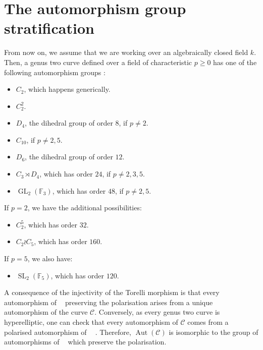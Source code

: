\documentclass{amsart}
\newcommand{\calC}{\mathcal{C}}
\DeclareMathOperator{\Aut}{Aut}
\DeclareMathOperator{\Jac}{Jac}
\DeclareMathOperator{\Jacc}{\Jac(\mathcal{C})}
\newcommand{\GL}{\operatorname{GL}}
\newcommand{\SL}{\operatorname{SL}}
\numberwithin{equation}{section}
\theoremstyle{definition}
\theoremstyle{remark}
\begin{document}
\section{The automorphism group stratification} \label{automorphism_section}
From now on, we assume that we are working over an algebraically closed field $k$. Then, a genus two curve defined over a field of characteristic $p\geq0$ has one of the following automorphism groups \cite{Igusa1960ArithmeticTwo}:
\begin{itemize}
    \item \href{https://beta.lmfdb.org/Groups/Abstract/2.1}{$C_2$}, which happens generically.
    \item \href{https://beta.lmfdb.org/Groups/Abstract/4.2}{$C_2^2$}.
    \item \href{https://beta.lmfdb.org/Groups/Abstract/8.3}{$D_4$}, the dihedral group of order $8$, if $p\neq2$.
    \item \href{https://beta.lmfdb.org/Groups/Abstract/10.2}{$C_{10}$}, if $p\neq 2,5$.
    \item \href{https://beta.lmfdb.org/Groups/Abstract/12.4}{$D_{6}$}, the dihedral group of order $12$.
    \item \href{https://beta.lmfdb.org/Groups/Abstract/24.8}{$C_3\rtimes D_4$}, which has order $24$, if $p\neq 2,3,5$.
    \item \href{https://beta.lmfdb.org/Groups/Abstract/48.29}{$\GL_2(\mathbb{F}_3)$}, which has order $48$, if $p\neq 2,5$.\\
\end{itemize}
If $p=2$, we have the additional possibilities:
\begin{itemize}
    \item \href{https://beta.lmfdb.org/Groups/Abstract/32.51}{$C_2^5$}, which has order $32$.
    \item \href{https://beta.lmfdb.org/Groups/Abstract/160.235}{$C_2\wr C_5$}, which has order $160$.\\
\end{itemize}
If $p=5$, we also have:
\begin{itemize}
    \item \href{https://beta.lmfdb.org/Groups/Abstract/120.5}{$\SL_2(\mathbb{F}_5)$}, which has order $120$.\\
\end{itemize}

A consequence of the injectivity of the Torelli morphism is that every automorphism of $\Jacc$ preserving the polarisation arises from a unique automorphism of the curve $\calC$. Conversely, as every genus two curve is hyperelliptic, one can check that every automorphism of $\calC$ comes from a polarised automorphism of $\Jacc$ \cite[Theorem 12.1]{Milne1986JacobianVarieties}. Therefore, $\Aut(\calC)$ is isomorphic to the group of automorphisms of $\Jacc$ which preserve the polarisation. \\
\end{document}
